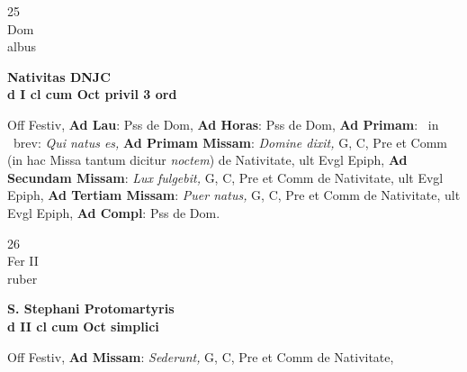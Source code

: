 \documentclass[10pt, openany]{book}
\begin{document}
        \begin{center}
            \begin{minipage}{3.5in}
                \vspace{2em}
                \begin{minipage}{0.5in}
                    {\Huge 25} \\
                    {\normalsize Dom} \\
                    {\normalsize albus}
                \end{minipage}
                \begin{minipage}{3.0in}
                    \textbf{ \large Nativitas DNJC \\
                    \textnormal{\normalsize d I cl cum Oct privil 3 ord}} \\ 
                \end{minipage}
                \begin{justify}Off Festiv, \textbf{Ad Lau}: Pss de Dom, \textbf{Ad Horas}: Pss de Dom, \textbf{Ad Primam}: \Vbar\ in \Rbar\ brev: \textit{Qui natus es,} \textbf{Ad Primam Missam}: \textit{Domine dixit,} G, C, Pre et Comm (in hac Missa tantum dicitur \textit{noctem}) de Nativitate,  ult Evgl Epiph,  \textbf{Ad Secundam Missam}: \textit{Lux fulgebit,} G, C, Pre et Comm de Nativitate,  ult Evgl Epiph,  \textbf{Ad Tertiam Missam}: \textit{Puer natus,} G, C, Pre et Comm de Nativitate,  ult Evgl Epiph,  \textbf{Ad Compl}: Pss de Dom. 
                \end{justify}
            \end{minipage}
        \end{center}
    
        \begin{center}
            \begin{minipage}{3.5in}
                \vspace{2em}
                \begin{minipage}{0.5in}
                    {\Huge 26} \\
                    {\normalsize Fer II} \\
                    {\normalsize ruber}
                \end{minipage}
                \begin{minipage}{3.0in}
                    \textbf{ \large S. Stephani Protomartyris \\
                    \textnormal{\normalsize d II cl cum Oct simplici}} \\ 
                \end{minipage}
                \begin{justify}Off Festiv, \textbf{Ad Missam}: \textit{Sederunt,} G, C, Pre et Comm de Nativitate,   
                \end{justify}
            \end{minipage}
        \end{center}
    
\end{document}

